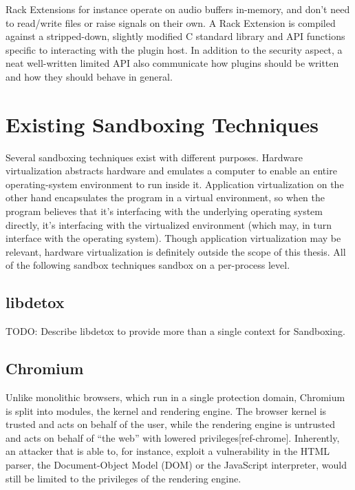 Rack Extensions for instance operate on audio buffers in-memory, and don't need
to read/write files or raise signals on their own.
A Rack Extension is compiled against a stripped-down, slightly modified C
standard library and API functions specific to interacting with the plugin host.
In addition to the security aspect, a neat well-written limited API also
communicate how plugins should be written and how they should behave in general.


\section {Existing Sandboxing Techniques}

Several sandboxing techniques exist with different purposes.
Hardware virtualization abstracts hardware and emulates a computer to enable an
entire operating-system environment to run inside it.
Application virtualization on the other hand encapsulates the program in a
virtual environment, so when the program believes that it's interfacing with the
underlying operating system directly, it's interfacing with the virtualized
environment (which may, in turn interface with the operating system).
Though application virtualization may be relevant, hardware virtualization is
definitely outside the scope of this thesis.
All of the following sandbox techniques sandbox on a per-process level.

\subsection {libdetox}

TODO: Describe libdetox to provide more than a single context for Sandboxing.

\subsection {Chromium}

Unlike monolithic browsers, which run in a single protection domain, Chromium
is split into modules, the kernel and rendering engine.
The browser kernel is trusted and acts on behalf of the user, while the
rendering engine is untrusted and acts on behalf of ``the web'' with lowered
privileges[ref-chrome].
Inherently, an attacker that is able to, for instance, exploit a vulnerability
in the HTML parser, the Document-Object Model (DOM) or the JavaScript
interpreter, would still be limited to the privileges of the rendering engine.

